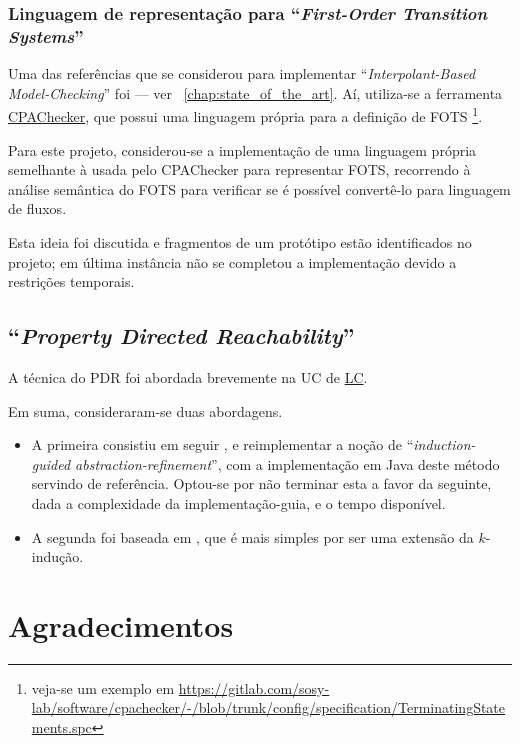\documentclass[11pt,a4paper]{report}%
\def\pdr{``\textit{Property Directed Reachability}''\xspace}
\def\imc{``\textit{Interpolant-Based Model-Checking}''\xspace}
\def\fotss{``\textit{First-Order Transition Systems}''\xspace}
\def\cpa{\href{https://cpachecker.sosy-lab.org/}{CPAChecker\xspace}}
\begin{document}
\subsubsection{Linguagem de representação para \fotss}

Uma das referências que se considerou para implementar \imc foi \cite{interpolation_state_of_art} --- ver ~\ref{chap:state_of_the_art}.
Aí, utiliza-se a ferramenta \cpa, que possui uma linguagem
própria para a definição de FOTS \footnote{veja-se um exemplo em \url{https://gitlab.com/sosy-lab/software/cpachecker/-/blob/trunk/config/specification/TerminatingStatements.spc}}.

Para este projeto, considerou-se a implementação de uma linguagem própria semelhante à usada pelo CPAChecker
para representar FOTS, recorrendo à análise semântica do FOTS para verificar se é possível convertê-lo
para linguagem de fluxos.

Esta ideia foi discutida e fragmentos de um protótipo estão identificados no projeto; em última instância
não se completou a implementação devido a restrições temporais.

\label{intro:pdr}
\subsection{\pdr}

A técnica do PDR foi abordada brevemente na UC de \href{https://paper.dropbox.com/doc/Capitulo-3-Satisfiability-Modulo-Theories-2-Parte-zorZj2G3ceOIi92zrE0n1#:uid=529328955569390400002306&h2=%E2%80%9CProperty-Directed-Reachabilit}{LC}.

Em suma, consideraram-se duas abordagens.

\begin{itemize}
    \item A primeira consistiu em seguir \cite{ctigar}, e reimplementar a noção de
    ``\textit{induction-guided abstraction-refinement}'', com a implementação em Java
    deste método servindo de referência.
    Optou-se por não terminar esta a favor da seguinte, dada a complexidade da implementação-guia,
    e o tempo disponível.
    \item A segunda foi baseada em \cite{pdr_state_of_art}, que é mais simples por ser uma extensão
    da $k$-indução.
\end{itemize}

\section{Agradecimentos}
\end{document}

